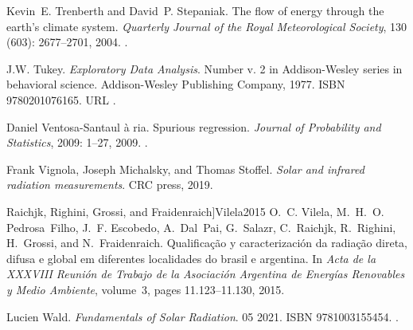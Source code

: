 \documentclass[letterpaper,12pt, twoside]{report}
\providecommand{\DIFdeltex}[1]{{\protect\color{red} \scriptsize #1}} %
\providecommand{\DIFdel}[1]{\texorpdfstring{\DIFdeltex{#1}}{}} %
\begin{document}
\DIFdel{Kevin~E. Trenberth and David~P. Stepaniak.
}%
\DIFdel{The flow of energy through the earth's climate system.
}%
\DIFdel{\emph{Quarterly Journal of the Royal Meteorological Society},
  130}%
\DIFdel{(603):}%
\DIFdel{2677--2701, 2004.
}%
\DIFdel{.
}%

\DIFdel{J.W. Tukey.
}%
\DIFdel{\emph{Exploratory Data Analysis}.
}%
\DIFdel{Number v. 2 in Addison-Wesley series in behavioral science.
  Addison-Wesley Publishing Company, 1977.
}%
\DIFdel{ISBN 9780201076165.
}%
\DIFdel{URL }%
\DIFdel{.
}%

\DIFdel{Daniel Ventosa-Santaul}%
\DIFdel{\`a}%
\DIFdel{ria.
}%
\DIFdel{Spurious regression.
}%
\DIFdel{\emph{Journal of Probability and Statistics}, 2009:}%
\DIFdel{1--27,
  2009.
}%
\DIFdel{.
}%

\DIFdel{Frank Vignola, Joseph Michalsky, and Thomas Stoffel.
}%
\DIFdel{\emph{Solar and infrared radiation measurements}.
}%
\DIFdel{CRC press, 2019.
}%

  Raichjk, Righini, Grossi, and Fraidenraich]{Vilela2015}
\DIFdel{O.~C. Vilela, M.~H.~O. Pedrosa~Filho, J.~F. Escobedo, A.~Dal~Pai, G.~Salazr,
  C.~Raichjk, R.~Righini, H.~Grossi, and N.~Fraidenraich.
}%
\DIFdel{Qualificação y caracterización da radiação direta, difusa e
  global em diferentes localidades do brasil e argentina.
}%
\DIFdel{In \emph{Acta de la XXXVIII Reunión de Trabajo de la Asociación
  Argentina de Energías Renovables y Medio Ambiente}, volume~3, pages
  11.123--11.130, 2015.
}%

\DIFdel{Lucien Wald.
}%
\DIFdel{\emph{Fundamentals of Solar Radiation}.
}%
\DIFdel{05 2021.
}%
\DIFdel{ISBN 9781003155454.
}%
\DIFdel{.
}%
\end{document}
